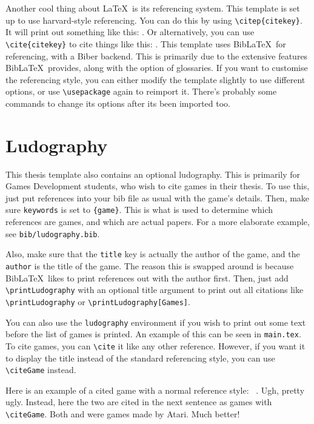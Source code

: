 Another cool thing about \LaTeX~is its referencing system. This template is set up to use harvard-style referencing. You can do this by using \texttt{\textbackslash citep\{citekey\}}. It will print out something like this: \citep{aad2012observation}. Or alternatively, you can use \texttt{\textbackslash cite\{citekey\}} to cite things like this: \cite{chatrchyan2012observation}. This template uses Bib\LaTeX~for referencing, with a Biber backend. This is primarily due to the extensive features Bib\LaTeX~provides, along with the option of glossaries. If you want to customise the referencing style, you can either modify the template slightly to use different options, or use \texttt{\textbackslash usepackage} again to reimport it. There's probably some commands to change its options after its been imported too.

\section{Ludography}
This thesis template also contains an optional ludography. This is primarily for Games Development students, who wish to cite games in their thesis. To use this, just put references into your bib file as usual with the game's details. Then, make sure \texttt{keywords} is set to \texttt{\{game\}}. This is what is used to determine which references are games, and which are actual papers. For a more elaborate example, see \texttt{bib/ludography.bib}.

Also, make sure that the \texttt{title} key is actually the author of the game, and the \texttt{author} is the title of the game. The reason this is swapped around is because Bib\LaTeX~likes to print references out with the author first. Then, just add \texttt{\textbackslash printLudography} with an optional title argument to print out all citations like \texttt{\textbackslash printLudography} or \texttt{\textbackslash printLudography[Games]}.

You can also use the \texttt{ludography} environment if you wish to print out some text before the list of games is printed. An example of this can be seen in \texttt{main.tex}. To cite games, you can \texttt{\textbackslash cite} it like any other reference. However, if you want it to display the title instead of the standard referencing style, you can use \texttt{\textbackslash citeGame} instead.

Here is an example of a cited game with a normal reference style: ~\cite{spaceinvaders}. Ugh, pretty ugly. Instead, here the two are  cited in the next sentence as games with \texttt{\textbackslash citeGame}. Both  and  were games made by Atari. Much better!
